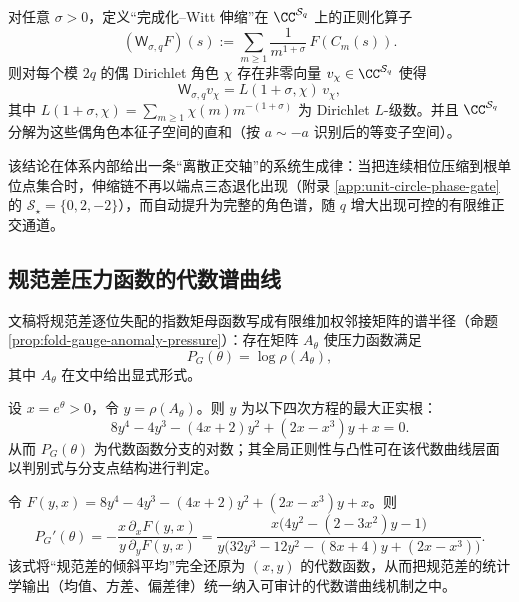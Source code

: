 \begin{theorem}[根单位点角色对角化]\label{thm:root-unit-character-diagonalization}
对任意 \(\sigma>0\)，定义“完成化--Witt 伸缩”在 \(\CC^{\mathcal{S}_q}\) 上的正则化算子
\begin{equation}\label{eq:root-unit-W-sigma}
(\mathsf{W}_{\sigma,q}F)(s):=\sum_{m\ge 1}\frac{1}{m^{1+\sigma}}\,F(C_m(s)).
\end{equation}
则对每个模 \(2q\) 的偶 Dirichlet 角色 \(\chi\) 存在非零向量 \(v_\chi\in\CC^{\mathcal{S}_q}\) 使得
\[
\mathsf{W}_{\sigma,q}v_\chi=L(1+\sigma,\chi)\,v_\chi,
\]
其中 \(L(1+\sigma,\chi)=\sum_{m\ge 1}\chi(m)m^{-(1+\sigma)}\) 为 Dirichlet \(L\)-级数。并且 \(\CC^{\mathcal{S}_q}\) 分解为这些偶角色本征子空间的直和（按 \(a\sim -a\) 识别后的等变子空间）。
\end{theorem}

该结论在体系内部给出一条“离散正交轴”的系统生成律：当把连续相位压缩到根单位点集合时，伸缩链不再以端点三态退化出现（附录 \ref{app:unit-circle-phase-gate} 的 \(\mathcal{S}_\star=\{0,2,-2\}\)），而自动提升为完整的角色谱，随 \(q\) 增大出现可控的有限维正交通道。

\subsection{规范差压力函数的代数谱曲线}\label{subsec:gauge-pressure-algebraic-curve}

文稿将规范差逐位失配的指数矩母函数写成有限维加权邻接矩阵的谱半径（命题 \ref{prop:fold-gauge-anomaly-pressure}）：存在矩阵 \(A_\theta\) 使压力函数满足
\[
P_G(\theta)=\log\rho(A_\theta),
\]
其中 \(A_\theta\) 在文中给出显式形式。

\begin{theorem}[压力谱曲线的四次代数方程]\label{thm:gauge-pressure-quartic}
设 \(x=e^\theta>0\)，令 \(y=\rho(A_\theta)\)。则 \(y\) 为以下四次方程的最大正实根：
\begin{equation}\label{eq:gauge-pressure-quartic}
8y^4-4y^3-(4x+2)y^2+(2x-x^3)y+x=0.
\end{equation}
从而 \(P_G(\theta)\) 为代数函数分支的对数；其全局正则性与凸性可在该代数曲线层面以判别式与分支点结构进行判定。
\end{theorem}

\begin{corollary}[倾斜平均失配率的闭式表达]\label{cor:gauge-pressure-tilt-derivative}
令 \(F(y,x)=8y^4-4y^3-(4x+2)y^2+(2x-x^3)y+x\)。则
\begin{equation}\label{eq:gauge-pressure-P-prime}
P_G'(\theta)=-\frac{x\,\partial_x F(y,x)}{y\,\partial_y F(y,x)}
=\frac{x\bigl(4y^2-(2-3x^2)y-1\bigr)}{y\bigl(32y^3-12y^2-(8x+4)y+(2x-x^3)\bigr)}.
\end{equation}
该式将“规范差的倾斜平均”完全还原为 \((x,y)\) 的代数函数，从而把规范差的统计学输出（均值、方差、偏差律）统一纳入可审计的代数谱曲线机制之中。
\end{corollary}

